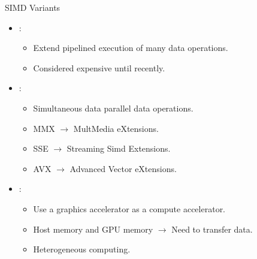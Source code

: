 \begin{frame}[t]{SIMD Variants}
\begin{itemize}
  \item {}:
    \begin{itemize}
      \item Extend pipelined execution of many data operations.
      \item Considered expensive until recently.
    \end{itemize}

  \item {}:
    \begin{itemize}
      \item Simultaneous data parallel data operations.
      \item MMX $\rightarrow$ MultMedia eXtensions.
      \item SSE $\rightarrow$ Streaming Simd Extensions.
      \item AVX $\rightarrow$ Advanced Vector eXtensions.
    \end{itemize}

  \item {}:
    \begin{itemize}
      \item Use a graphics accelerator as a compute accelerator.
      \item Host memory and GPU memory $\rightarrow$ Need to transfer data.
      \item Heterogeneous computing.
    \end{itemize}

\end{itemize}
\end{frame}
